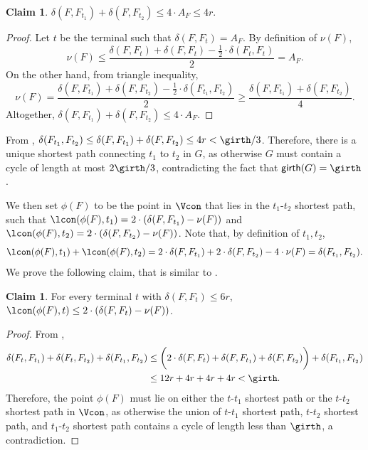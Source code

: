\documentclass[11pt]{article}
\theoremstyle{definition}
\newtheorem{claim}[theorem]{Claim}
\newcommand{\gir}{\textnormal{\textsf{girth}}}
\begin{document}
\begin{titlepage}
\begin{claim} \label{clm:g-tree}
$\delta(F,F_{t_1}) + \delta(F,F_{t_2}) \le 4\cdot A_F \le 4r$.
\end{claim}
\begin{proof}
Let $t$ be the terminal such that $\delta(F,F_t) = A_F$. By definition of $\nu(F)$, 
$$\nu(F) \le \frac{\delta(F,F_t)+\delta(F,F_t)- \frac{1}{2}\cdot \delta(F_t,F_t)}{2} = A_F.$$ 
On the other hand, from triangle inequality, %
$$\nu(F) = \frac{\delta(F,F_{t_1})+\delta(F,F_{t_2}) - \frac 1 2\cdot \delta(F_{t_1},F_{t_2})}{2} \ge \frac{\delta(F,F_{t_1})+\delta(F,F_{t_2})}{4}.$$ Altogether, $\delta(F,F_{t_1})+\delta(F,F_{t_2}) \le 4\cdot A_F$. 
\end{proof}

From , $\delta(F_{t_1},F_{t_2}) \le \delta(F,F_{t_1}) + \delta(F,F_{t_2})\le 4r < \girth/3$. Therefore, there is a unique shortest path connecting $t_1$ to $t_2$ in $G$, as otherwise $G$ must contain a cycle of length at most $2\girth/3$, contradicting the fact that $\gir(G)=\girth$. %
 
We then set $\phi(F)$ to be the point in $\Vcon$ that lies in the $t_1$-$t_2$ shortest path, such that $\lcon(\phi(F),t_1) = 2\cdot (\delta(F,F_{t_1}) - \nu(F))$ and $\lcon(\phi(F),t_2) = 2\cdot (\delta(F,F_{t_2}) - \nu(F))$. Note that, by definition of $t_1,t_2$,
\[
\lcon(\phi(F),t_1)+\lcon(\phi(F),t_2)=2\cdot \delta(F,F_{t_1}) +2\cdot \delta(F,F_{t_2}) - 4\cdot \nu(F)=\delta(F_{t_1},F_{t_2}).
\] 
We prove the following claim, that is similar to .
    

    \begin{claim} \label{clm:g-proj}
        For every terminal $t$ with $\delta(F,F_t) \le 6r$, $\lcon(\phi(F),t) \le 2\cdot (\delta(F,F_t) - \nu(F))$.
    \end{claim} 

    \begin{proof}
From , 
\[
\begin{split}
\delta(F_t,F_{t_1}) + \delta(F_t,F_{t_2}) + \delta(F_{t_1},F_{t_2}) & \le  \bigg(2\cdot \delta(F,F_t) + \delta(F,F_{t_1}) + \delta(F,F_{t_2})\bigg) + \delta(F_{t_1},F_{t_2}) \\ 
& \le  12 r + 4 r + 4 r + 4 r < \girth.
\end{split}
\] 
Therefore, the point $\phi(F)$ must lie on either the $t$-${t_1}$ shortest path or the $t$-${t_2}$ shortest path in $\Vcon$, as otherwise the union of $t$-${t_1}$ shortest path, $t$-${t_2}$ shortest path, and $t_1$-${t_2}$ shortest path contains a cycle of length less than $\girth$, a contradiction.  


\end{proof}
\end{titlepage}
\end{document}
